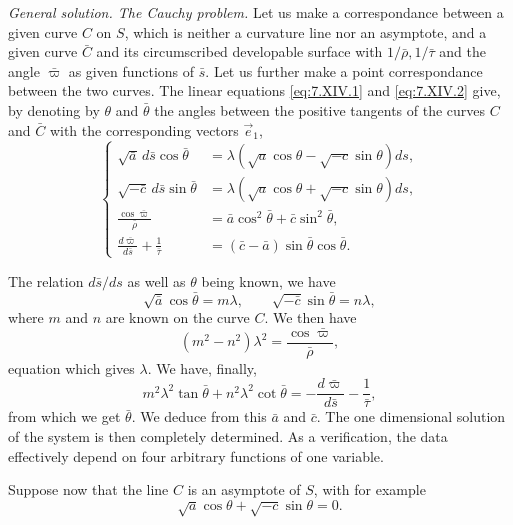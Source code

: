 \documentclass[leqno,11pt]{book}
\numberwithin{equation}{chapter}
\theoremstyle{shape1}
\theoremstyle{shape0}
\theoremstyle{shape2}
\theoremstyle{definition}
\begin{document}
\vspace{12pt}\fsec \emph{General solution. The Cauchy problem.} Let us make a correspondance between a given curve $C$ on $S$, which is neither a curvature line nor an asymptote, and a given curve $\bar C$ and its circumscribed developable surface with $1/\bar\rho,1/\bar\tau$ and the angle $\bar\varpi$ as given functions of $\bar s$. Let us further make a point correspondance between the two curves. The linear equations \eqref{eq:7.XIV.1} and \eqref{eq:7.XIV.2} give, by denoting by $\theta$ and $\bar\theta$ the angles between the positive tangents of the curves $C$ and $\bar C$ with the corresponding vectors $\vec e_{1}$,
\begin{equation}
  \label{eq:7.XIV.5}\tag{XIV, 5}
  \left\{
    \begin{aligned}
    \sqrt{\bar a}\,d\bar s\cos\bar\theta&=\lambda(\sqrt{a}\cos\theta-\sqrt{-c}\sin\theta)ds,\\
    \sqrt{-\bar c}\,d\bar s\sin\bar\theta&=\lambda(\sqrt{a}\cos\theta+\sqrt{-c}\sin\theta)ds,\\
    \frac{\cos\bar\varpi}{\bar\rho}&=\bar a\cos^{2}\bar\theta+\bar c\sin^{2}\bar\theta,\\
    \frac{d\bar\varpi}{d\bar s}+\frac{1}{\bar\tau}&=(\bar c-\bar a)\sin\bar\theta\cos\bar\theta.
  \end{aligned}
  \right.
\end{equation}

The relation $d\bar s/ds$ as well as $\theta$ being known, we have
\[
\sqrt{\bar a}\cos\bar\theta=m\lambda,\qquad\sqrt{-\bar c}\sin\bar\theta=n\lambda,
\]
where $m$ and $n$ are known on the curve $C$. We then have
\[
(m^{2}-n^{2})\lambda^{2}=\frac{\cos\bar\varpi}{\bar\rho},
\]
equation which gives $\lambda$. We have, finally,
\[
m^{2}\lambda^{2}\tan\bar\theta+n^{2}\lambda^{2}\cot\bar\theta=-\frac{d\bar\varpi}{d\bar s}-\frac{1}{\bar\tau},
\]
from which we get $\bar \theta$. We deduce from this $\bar a$ and $\bar c$. The one dimensional solution of the system is then completely determined. As a verification, the data effectively depend on four arbitrary functions of one variable.

Suppose now that the line $C$ is an asymptote of $S$, with for example
\[
\sqrt{a}\cos\theta+\sqrt{-c}\sin\theta=0.
\]
\end{document}
